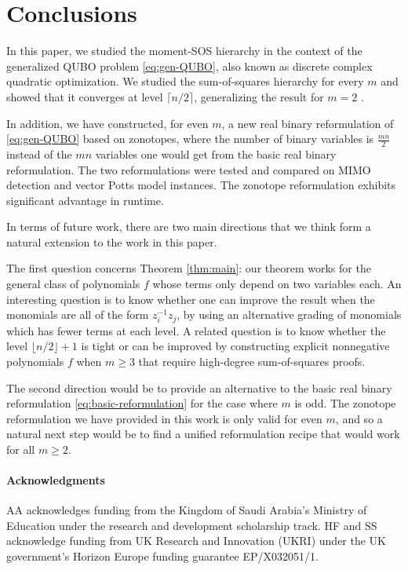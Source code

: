 \documentclass{article}
\theoremstyle{definition}
\begin{document}
\section{Conclusions}\label{sec:conclusions}

In this paper, we studied the moment-SOS hierarchy in the context of the generalized QUBO problem \eqref{eq:gen-QUBO}, also known as discrete complex quadratic optimization. We studied the sum-of-squares hierarchy for every $m$ and showed that it converges at level $\lceil n/2\rceil$, generalizing the result for $m=2$ \cite{fawzi2016sparse}. 

In addition, we have constructed, for even $m$, a new real binary reformulation of \eqref{eq:gen-QUBO} based on zonotopes, where the number of binary variables is $\frac{mn}{2}$ instead of the $mn$ variables one would get from the basic real binary reformulation. The two reformulations were tested and compared on MIMO detection and vector Potts model instances. The zonotope reformulation exhibits significant advantage in runtime.

In terms of future work, there are two main directions that we think form a natural extension to the work in this paper. 


The first question concerns Theorem \ref{thm:main}: our theorem works for the general class of polynomials $f$ whose terms only depend on two variables each. An interesting question is to know whether one can improve the result when the monomials are all of the form $z_i^{-1} z_j$, by using an alternative grading of monomials which has fewer terms at each level. A related question is to know whether the level $\lfloor n/2 \rfloor+1$ is tight or can be improved by constructing explicit nonnegative polynomials $f$ when $m \geq 3$ that require high-degree sum-of-squares proofs.


The second direction would be to provide an alternative to the basic real binary reformulation \eqref{eq:basic-reformulation} for the case where $m$ is odd. The zonotope reformulation we have provided in this work is only valid for even $m$, and so a natural next step would be to find a unified reformulation recipe that would work for all $m \geq 2$.

\paragraph{Acknowledgments} AA acknowledges funding from the Kingdom of Saudi Arabia's Ministry of Education under the research and development scholarship track. HF and SS acknowledge funding from
UK Research and Innovation (UKRI) under the UK government’s Horizon Europe funding guarantee
EP/X032051/1.



\end{document}
